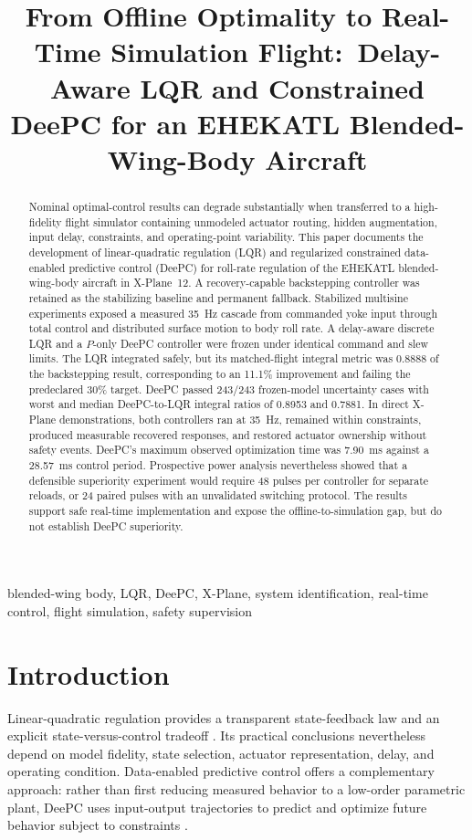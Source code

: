 \documentclass[conference]{IEEEtran}
\title{From Offline Optimality to Real-Time Simulation Flight:\
Delay-Aware LQR and Constrained DeePC for an EHEKATL Blended-Wing-Body Aircraft}
\author{%
\IEEEauthorblockN{Author Name(s)}
\IEEEauthorblockA{Department and Institution\\
City, Country\\
email@example.com}}
\begin{document}
\maketitle

\begin{abstract}
Nominal optimal-control results can degrade substantially when transferred to a
high-fidelity flight simulator containing unmodeled actuator routing, hidden
augmentation, input delay, constraints, and operating-point variability. This
paper documents the development of linear-quadratic regulation (LQR) and
regularized constrained data-enabled predictive control (DeePC) for roll-rate
regulation of the EHEKATL blended-wing-body aircraft in X-Plane~12. A
recovery-capable backstepping controller was retained as the stabilizing
baseline and permanent fallback. Stabilized multisine experiments exposed a
measured \SI{35}{\hertz} cascade from commanded yoke input through total control and
distributed surface motion to body roll rate. A delay-aware discrete LQR and a
$P$-only DeePC controller were frozen under identical command and slew limits.
The LQR integrated safely, but its matched-flight integral metric was 0.8888 of
the backstepping result, corresponding to an 11.1\% improvement and failing the
predeclared 30\% target. DeePC passed 243/243 frozen-model uncertainty cases
with worst and median DeePC-to-LQR integral ratios of 0.8953 and 0.7881. In
direct X-Plane demonstrations, both controllers ran at \SI{35}{\hertz}, remained
within constraints, produced measurable recovered responses, and restored
actuator ownership without safety events. DeePC's maximum observed optimization
time was \SI{7.90}{\milli\second} against a \SI{28.57}{\milli\second} control period. Prospective
power analysis nevertheless showed that a defensible superiority experiment
would require 48 pulses per controller for separate reloads, or 24 paired
pulses with an unvalidated switching protocol. The results support safe
real-time implementation and expose the offline-to-simulation gap, but do not
establish DeePC superiority.
\end{abstract}

\begin{IEEEkeywords}
blended-wing body, LQR, DeePC, X-Plane, system identification, real-time
control, flight simulation, safety supervision
\end{IEEEkeywords}

\section{Introduction}
Linear-quadratic regulation provides a transparent state-feedback law and an
explicit state-versus-control tradeoff \cite{kalman1960}. Its practical
conclusions nevertheless depend on model fidelity, state selection, actuator
representation, delay, and operating condition. Data-enabled predictive
control offers a complementary approach: rather than first reducing measured
behavior to a low-order parametric plant, DeePC uses input-output trajectories
to predict and optimize future behavior subject to constraints
\cite{coulson2019,coulson2022}.
\end{document}
